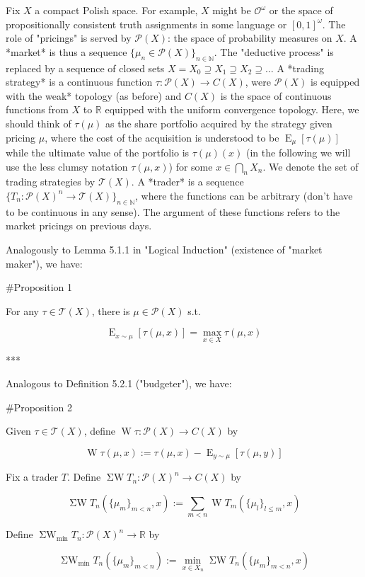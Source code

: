 \documentclass[a4paper]{article}
\DeclareMathOperator{\E}{E}
\newcommand{\Nats}{\mathbb{N}}
\newcommand{\Reals}{\mathbb{R}}
\newcommand{\Prob}{\mathcal{P}}
\newcommand{\T}{\mathcal{T}(X)}
\newcommand{\W}{\operatorname{W}}
\newcommand{\SW}{\operatorname{\Sigma W}}
\newcommand{\SWm}{\operatorname{\Sigma W}_{\min}}
\begin{document}
Fix ${X}$ a compact Polish space. For example, ${X}$ might be ${\mathcal{O}^\omega}$ or the space of propositionally consistent truth assignments in some language or ${[0,1]^\omega}$. The role of "pricings" is served by ${\Prob(X)}$: the space of probability measures on ${X}$. A *market* is thus a sequence ${\{\mu_n \in \Prob(X)\}_{n \in \Nats}}$. The "deductive process" is replaced by a sequence of closed sets ${X = X_0 \supseteq X_1 \supseteq X_2 \supseteq \ldots}$ A *trading strategy* is a continuous function ${\tau: \Prob(X) \rightarrow C(X)}$, were ${\Prob(X)}$ is equipped with the weak* topology (as before) and ${C(X)}$ is the space of continuous functions from ${X}$ to ${\Reals}$ equipped with the uniform convergence topology. Here, we should think of ${\tau(\mu)}$ as the share portfolio acquired by the strategy given pricing ${\mu}$, where the cost of the acquisition is understood to be ${\E_\mu[\tau(\mu)]}$ while the ultimate value of the portfolio is ${\tau(\mu)(x)}$ (in the following we will use the less clumsy notation ${\tau(\mu,x)}$) for some ${x \in \bigcap_n X_n}$. We denote the set of trading strategies by ${\T}$. A *trader* is a sequence ${\{T_n: \Prob(X)^n \rightarrow \T\}_{n \in \Nats}}$, where the functions can be arbitrary (don't have to be continuous in any sense). The argument of these functions refers to the market pricings on previous days.

Analogously to Lemma 5.1.1 in "Logical Induction" (existence of "market maker"), we have:

\#Proposition 1

For any ${\tau \in \T}$, there is ${\mu \in \Prob(X)}$ s.t.

$$\E_{x \sim \mu}[\tau(\mu,x)] = \max_{x \in X} \tau(\mu,x)$$

***

Analogous to Definition 5.2.1 ("budgeter"), we have:

\#Proposition 2

Given ${\tau \in \T}$, define ${\W\tau: \Prob(X) \rightarrow C(X)}$ by

$$\W\tau(\mu,x):=\tau(\mu,x)-\E_{y \sim \mu}[\tau(\mu,y)]$$

Fix a trader ${T}$. Define ${\SW T_n: \Prob(X)^n \rightarrow C(X)}$ by

$$\SW T_n(\{\mu_m\}_{m < n}, x):=\sum_{m<n} \W T_m(\{\mu_l\}_{l \leq m},x)$$

Define ${\SWm T_n: \Prob(X)^n \rightarrow \Reals}$ by

$$\SWm T_n(\{\mu_m\}_{m < n}):=\min_{x \in X_n} \SW T_n(\{\mu_m\}_{m < n}, x)$$
\end{document}
